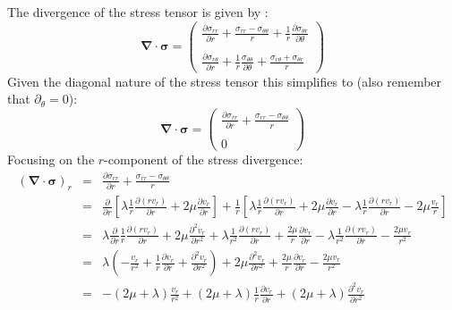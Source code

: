 The divergence of the stress tensor is given by \cite{scto01}:
\begin{equation}
{\bm \nabla}\cdot {\bm \sigma} 
=
\left(
\begin{array}{c}
\frac{\partial \sigma_{rr}}{\partial r} + \frac{\sigma_{rr}-\sigma_{\theta\theta}}{r} + \frac{1}{r} \frac{\partial \sigma_{\theta r}}{\partial \theta} \\ \\
\frac{\partial \sigma_{r \theta}}{\partial r} + \frac{1}{r} \frac{\sigma_{\theta\theta}}{\partial \theta}
+\frac{\sigma_{r\theta} + \sigma_{\theta r}}{r}
\end{array}
\right)
\end{equation}
Given the diagonal nature of the stress tensor this simplifies to (also remember that $\partial_\theta =0$):
\begin{equation}
{\bm \nabla}\cdot {\bm \sigma} 
=
\left(
\begin{array}{c}
\frac{\partial \sigma_{rr}}{\partial r} + \frac{\sigma_{rr}-\sigma_{\theta\theta}}{r} \\ \\
0
\end{array}
\right)
\end{equation}
Focusing on the $r$-component of the stress divergence:
\begin{eqnarray}
({\bm \nabla}\cdot {\bm \sigma})_r 
&=& 
\frac{\partial \sigma_{rr}}{\partial r} + \frac{\sigma_{rr}-\sigma_{\theta\theta}}{r} \\
&=& 
\frac{\partial }{\partial r} \left[
\lambda \frac{1}{r} \frac{\partial (r v_r)}{\partial r} + 2\mu\frac{\partial v_r}{\partial r} 
 \right] 
+ \frac{1}{r}
\left[
\lambda \frac{1}{r} \frac{\partial (r v_r)}{\partial r} + 2\mu\frac{\partial v_r}{\partial r} 
-
\lambda \frac{1}{r} \frac{\partial (r v_r)}{\partial r}  -  2 \mu\frac{v_r}{r} 
\right] \\
 &=& 
\lambda \frac{\partial }{\partial r}  \frac{1}{r} \frac{\partial (r v_r)}{\partial r} 
+ 2\mu\frac{\partial^2 v_r}{\partial r^2} 
+ 
\lambda \frac{1}{r^2} \frac{\partial (r v_r)}{\partial r} + \frac{2\mu}{r}\frac{\partial v_r}{\partial r} 
- \lambda \frac{1}{r^2} \frac{\partial (r v_r)}{\partial r}  - \frac{2 \mu v_r}{r^2} \\
&=&
\lambda ( -\frac{v_r}{r^2} + \frac{1}{r} \frac{\partial v_r}{\partial r} + \frac{\partial^2 v_r}{\partial r^2} )
+ 2\mu\frac{\partial^2 v_r}{\partial r^2} 
+ \frac{2\mu}{r}\frac{\partial v_r}{\partial r}
- \frac{2 \mu v_r}{r^2} \\ 
&=&
-(2\mu+\lambda)\frac{v_r}{r^2} 
+(2\mu+\lambda)\frac{1}{r}\frac{\partial v_r}{\partial r}  
+(2\mu+\lambda)\frac{\partial^2 v_r}{\partial r^2}  
\end{eqnarray}
